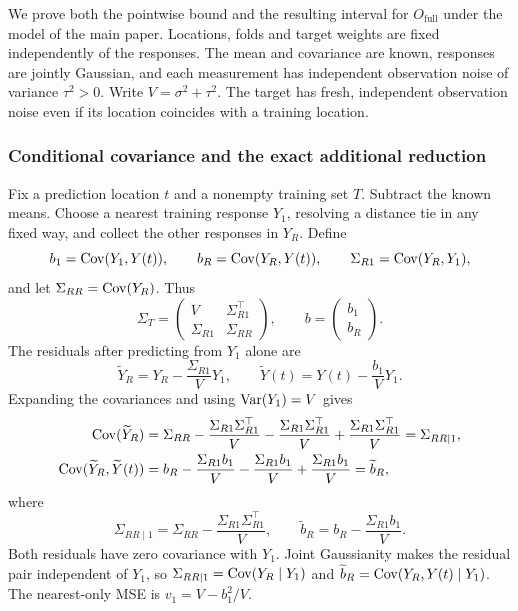 We prove both the pointwise bound and the resulting interval for $O_{\mathrm{full}}$ under the model of the main paper. Locations, folds and target weights are fixed independently of the responses. The mean and covariance are known, responses are jointly Gaussian, and each measurement has independent observation noise of variance $\tau^2>0$. Write $V=\sigma^2+\tau^2$. The target has fresh, independent observation noise even if its location coincides with a training location.

\subsubsection{Conditional covariance and the exact additional reduction}
\label{sec:bound-residuals}
Fix a prediction location $t$ and a nonempty training set $T$. Subtract the known means. Choose a nearest training response $Y_1$, resolving a distance tie in any fixed way, and collect the other responses in $Y_R$. Define
\[
 b_1=\operatorname{Cov}(Y_1,Y(t)),\qquad b_R=\operatorname{Cov}(Y_R,Y(t)),\qquad
 \Sigma_{R1}=\operatorname{Cov}(Y_R,Y_1),
\]
and let $\Sigma_{RR}=\operatorname{Cov}(Y_R)$. Thus
\[
 \Sigma_T=\begin{pmatrix}V&\Sigma_{R1}^{\top}\\
 \Sigma_{R1}&\Sigma_{RR}\end{pmatrix},\qquad
 b=\begin{pmatrix}b_1\\b_R\end{pmatrix}.
\]
The residuals after predicting from $Y_1$ alone are
\[
 \widetilde Y_R=Y_R-\frac{\Sigma_{R1}}VY_1,
 \qquad \widetilde Y(t)=Y(t)-\frac{b_1}VY_1.
\]
Expanding the covariances and using $\operatorname{Var}(Y_1)=V$ gives
\begin{align*}
 \operatorname{Cov}(\widetilde Y_R)
 &=\Sigma_{RR}-\frac{\Sigma_{R1}\Sigma_{R1}^{\top}}V
   -\frac{\Sigma_{R1}\Sigma_{R1}^{\top}}V
   +\frac{\Sigma_{R1}\Sigma_{R1}^{\top}}V
 =\Sigma_{RR\mid1},\\
 \operatorname{Cov}(\widetilde Y_R,\widetilde Y(t))
 &=b_R-\frac{\Sigma_{R1}b_1}V-\frac{\Sigma_{R1}b_1}V
   +\frac{\Sigma_{R1}b_1}V=\widetilde b_R,
\end{align*}
where
\begin{equation}
 \Sigma_{RR\mid1}=\Sigma_{RR}-\frac{\Sigma_{R1}\Sigma_{R1}^{\top}}V,
 \qquad \widetilde b_R=b_R-\frac{\Sigma_{R1}b_1}V.
 \label{eq:conditional-covariances}
\end{equation}
Both residuals have zero covariance with $Y_1$. Joint Gaussianity makes the residual pair independent of $Y_1$, so $\Sigma_{RR\mid1}=\operatorname{Cov}(Y_R\mid Y_1)$ and $\widetilde b_R=\operatorname{Cov}(Y_R,Y(t)\mid Y_1)$. The nearest-only MSE is $v_1=V-b_1^2/V$.

